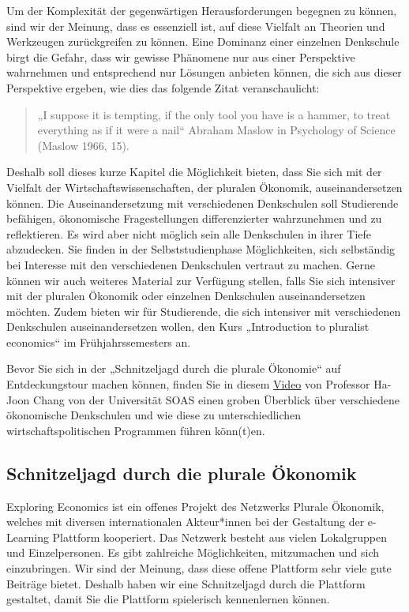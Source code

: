 \documentclass[
  nswissgerman,
  a4paper,
  DIV=11,
  numbers=noendperiod,
  oneside,
  openany]{scrreprt}
\begin{document}
Um der Komplexität der gegenwärtigen Herausforderungen begegnen zu
können, sind wir der Meinung, dass es essenziell ist, auf diese Vielfalt
an Theorien und Werkzeugen zurückgreifen zu können. Eine Dominanz einer
einzelnen Denkschule birgt die Gefahr, dass wir gewisse Phänomene nur
aus einer Perspektive wahrnehmen und entsprechend nur Lösungen anbieten
können, die sich aus dieser Perspektive ergeben, wie dies das folgende
Zitat veranschaulicht:

\begin{quote}
„I suppose it is tempting, if the only tool you have is a hammer, to
treat everything as if it were a nail`` Abraham Maslow in Psychology of
Science (Maslow 1966, 15).
\end{quote}

Deshalb soll dieses kurze Kapitel die Möglichkeit bieten, dass Sie sich
mit der Vielfalt der Wirtschaftswissenschaften, der pluralen Ökonomik,
auseinandersetzen können. Die Auseinandersetzung mit verschiedenen
Denkschulen soll Studierende befähigen, ökonomische Fragestellungen
differenzierter wahrzunehmen und zu reflektieren. Es wird aber nicht
möglich sein alle Denkschulen in ihrer Tiefe abzudecken. Sie finden in
der Selbststudienphase Möglichkeiten, sich selbständig bei Interesse mit
den verschiedenen Denkschulen vertraut zu machen. Gerne können wir auch
weiteres Material zur Verfügung stellen, falls Sie sich intensiver mit
der pluralen Ökonomik oder einzelnen Denkschulen auseinandersetzen
möchten. Zudem bieten wir für Studierende, die sich intensiver mit
verschiedenen Denkschulen auseinandersetzen wollen, den Kurs
„Introduction to pluralist economics`` im Frühjahrssemesters an.

Bevor Sie sich in der „Schnitzeljagd durch die plurale Ökonomie`` auf
Entdeckungstour machen können, finden Sie in diesem
\href{https://www.youtube.com/watch?v=NdbbcO35arw}{Video} von Professor
Ha-Joon Chang von der Universität SOAS einen groben Überblick über
verschiedene ökonomische Denkschulen und wie diese zu unterschiedlichen
wirtschaftspolitischen Programmen führen könn(t)en.

\subsection{Schnitzeljagd durch die plurale
Ökonomik}\label{schnitzeljagd-durch-die-plurale-uxf6konomik}

Exploring Economics ist ein offenes Projekt des Netzwerks Plurale
Ökonomik, welches mit diversen internationalen Akteur*innen bei der
Gestaltung der e-Learning Plattform kooperiert. Das Netzwerk besteht aus
vielen Lokalgruppen und Einzelpersonen. Es gibt zahlreiche
Möglichkeiten, mitzumachen und sich einzubringen. Wir sind der Meinung,
dass diese offene Plattform sehr viele gute Beiträge bietet. Deshalb
haben wir eine Schnitzeljagd durch die Plattform gestaltet, damit Sie
die Plattform spielerisch kennenlernen können.
\end{document}
